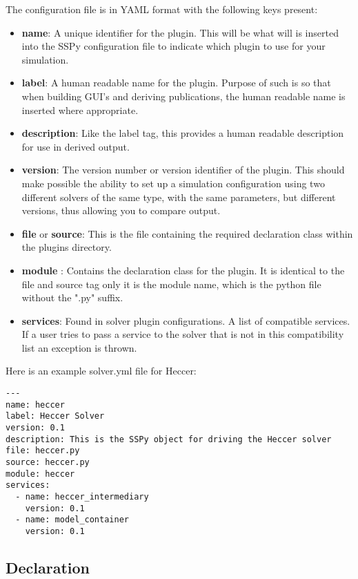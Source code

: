 \documentclass[12pt]{article}
\begin{document}
The configuration file is in YAML format with the following keys present:

\begin{itemize}
	\item[] {\bf name}: A unique identifier for the plugin. This will be what will is inserted into the SSPy configuration file to indicate which plugin to use for your simulation.
	\item[] {\bf label}: A human readable name for the plugin. Purpose of such is so that when building GUI's and deriving publications, the human readable name is inserted where appropriate. 
	\item[] {\bf description}: Like the label tag, this provides a human readable description for use in derived output.
	\item[] {\bf version}: The version number or version identifier of the plugin. This should make possible the ability to set up a simulation configuration using two different solvers of the same type, with the same parameters, but different versions, thus allowing you to compare output.
	\item[] {\bf file} or {\bf source}: This is the file containing the required declaration class within the plugins directory. 
	\item[] {\bf module} : Contains the declaration class for the plugin. It is identical to the file and source tag only it is the module name, which is the python file without the ".py" suffix.
	\item[]{\bf services}: Found in solver plugin configurations. A list of compatible services. If a user tries to pass a service to the solver that is not in this compatibility list an exception is thrown. 
\end{itemize}

Here is an example solver.yml file for Heccer:

\begin{verbatim}
---
name: heccer
label: Heccer Solver
version: 0.1
description: This is the SSPy object for driving the Heccer solver
file: heccer.py
source: heccer.py
module: heccer
services:
  - name: heccer_intermediary
    version: 0.1
  - name: model_container
    version: 0.1

\end{verbatim}


\subsection*{Declaration}
\end{document}
